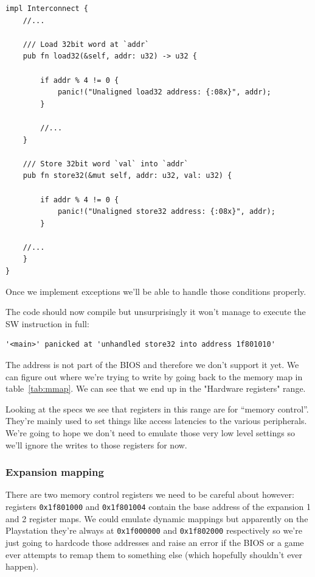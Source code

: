 \documentclass[a4paper]{article}
\newcommand{\code}[1] {\texttt{#1}}
\begin{document}
\begin{lstlisting}
impl Interconnect {
    //...

    /// Load 32bit word at `addr`
    pub fn load32(&self, addr: u32) -> u32 {

        if addr % 4 != 0 {
            panic!("Unaligned load32 address: {:08x}", addr);
        }

        //...
    }

    /// Store 32bit word `val` into `addr`
    pub fn store32(&mut self, addr: u32, val: u32) {

        if addr % 4 != 0 {
            panic!("Unaligned store32 address: {:08x}", addr);
        }

	//...
    }
}
\end{lstlisting}

Once we implement exceptions we'll be able to handle those conditions
properly.

The code should now compile but unsurprisingly it won't manage to
execute the SW instruction in full:

\begin{verbatim}
'<main>' panicked at 'unhandled store32 into address 1f801010'
\end{verbatim}

The address is not part of the BIOS and therefore we don't support it
yet. We can figure out where we're trying to write by going back to
the memory map in table~\ref{tab:mmap}. We can see that we end up in
the "Hardware registers" range.

Looking at the specs we see that registers in this range are for
``memory control''. They're mainly used to set things like access
latencies to the various peripherals. We're going to hope we don't
need to emulate those very low level settings so we'll ignore the
writes to those registers for now.

\subsubsection{Expansion mapping}

There are two memory control registers we need to be careful about
however: registers \code{0x1f801000} and \code{0x1f801004} contain
the base address of the expansion 1 and 2 register maps. We could
emulate dynamic mappings but apparently on the Playstation they're
always at \code{0x1f000000} and \code{0x1f802000} respectively so
we're just going to hardcode those addresses and raise an error if the
BIOS or a game ever attempts to remap them to something else (which
hopefully shouldn't ever happen).
\end{document}
